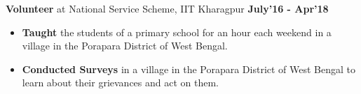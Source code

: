 \documentclass[10pt]{article}
\begin{document}
\large { \textbf{Volunteer} at National Service Scheme, IIT Kharagpur} \normalsize
{\hfill} \textbf{July'16 - Apr'18}\\[-1.8em]
\begin{itemize}
    \item \textbf{Taught} the students of a primary school for an hour each weekend in a village in the Porapara District of West Bengal. \\[-2em]
    \item \textbf{Conducted Surveys} in a village in the Porapara District of West Bengal to learn about their grievances and act on them. \\[-1em]
\end{itemize}
\end{document}
